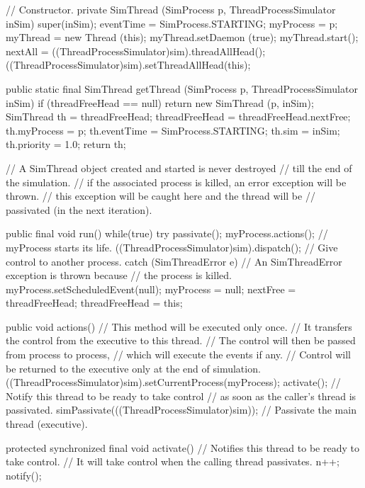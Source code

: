 \begin{code}
\begin{hide}
{    // Constructor.
   private SimThread (SimProcess p, ThreadProcessSimulator inSim) {
      super(inSim);
      eventTime = SimProcess.STARTING;
      myProcess = p;
      myThread = new Thread (this);
      myThread.setDaemon (true);
      myThread.start();
      nextAll = ((ThreadProcessSimulator)sim).threadAllHead();
      ((ThreadProcessSimulator)sim).setThreadAllHead(this);
    }

   public static final SimThread getThread (SimProcess p, ThreadProcessSimulator inSim) {
      if (threadFreeHead == null) return new SimThread (p, inSim);
      SimThread th = threadFreeHead;   threadFreeHead = threadFreeHead.nextFree;
      th.myProcess = p;
      th.eventTime = SimProcess.STARTING;
      th.sim       = inSim;
      th.priority  = 1.0;
      return th;
    }

   // A SimThread object created and started is never destroyed
   // till the end of the simulation.
   // if the associated process is killed, an error exception will be thrown.
   // this exception will be caught here and the thread will be
   // passivated (in the next iteration).

   public final void run() {
       while(true) {
           try {
               passivate();
               myProcess.actions();  // myProcess starts its life.
               ((ThreadProcessSimulator)sim).dispatch(); // Give control to another process.
           } catch (SimThreadError e) {} // An SimThreadError exception is thrown because
                                // the process is killed.
           myProcess.setScheduledEvent(null);
           myProcess = null;
           nextFree = threadFreeHead;   threadFreeHead = this;
       }
   }

   public void actions() {
   // This method will be executed only once.
   // It transfers the control from the executive to this thread.
   // The control will then be passed from process to process,
   // which will execute the events if any.
   // Control will be returned to the executive only at the end of simulation.
      ((ThreadProcessSimulator)sim).setCurrentProcess(myProcess);
      activate();  // Notify this thread to be ready to take control
                   // as soon as the caller's thread is passivated.
      simPassivate(((ThreadProcessSimulator)sim));  // Passivate the main thread (executive).
   }


   protected synchronized final void activate() {
   // Notifies this thread to be ready to take control.
   // It will take control when the calling thread passivates.
      n++;   notify();
   }


}
\end{hide}
\end{code}
